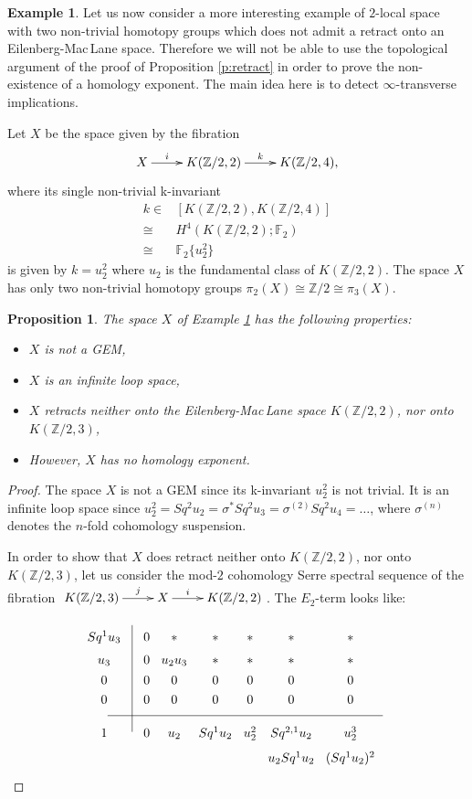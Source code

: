\documentclass{amsart}
\newtheorem{prop}[thm]{Proposition}
\theoremstyle{definition}
\newtheorem{exmp}[thm]{Example}
\theoremstyle{remark}
\newcommand{\Z}{\mathbb{Z}}
\newcommand{\F}{\mathbb{F}}
\begin{document}
\begin{exmp}\label{e:no_retract}
Let us now consider a more interesting example of $2$-local space with two non-trivial homotopy groups which does not admit a retract onto an Eilenberg-Mac\,Lane space. Therefore we will not be able to use the topological argument of the proof of Proposition \ref{p:retract} in order to prove the non-existence of a homology exponent. The main idea here is to detect $\infty$-transverse implications.

Let $X$ be the space given by the fibration
$$\xymatrix{
X\ar[r]^-i &K(\Z/2,2)\ar[r]^-k &K(\Z/2,4),
}$$
where its single non-trivial k-invariant
\begin{align*}
k \in& [K(\Z/2,2),K(\Z/2,4)]\\
\cong &H^4(K(\Z/2,2);\F_2)\\
\cong &\F_2\{u_2^2\}
\end{align*}
is given by $k=u_2^2$ where $u_2$ is the fundamental class of $K(\Z/2,2)$. The space $X$ has only two non-trivial homotopy groups $\pi_2(X)\cong\Z/2\cong\pi_3(X)$.

\begin{prop}\label{p:no_retract}
The space $X$ of Example \ref{e:no_retract} has the following properties:
\begin{itemize}
\item[1.]{$X$ is not a GEM,}
\item[2.]{$X$ is an infinite loop space,}
\item[3.]{$X$ retracts neither onto the Eilenberg-Mac\,Lane space $K(\Z/2,2)$, nor onto $K(\Z/2,3)$,}
\item[4.]{However, $X$ has no homology exponent.}
\end{itemize}
\end{prop}

\begin{proof}
The space $X$ is not a GEM since its k-invariant $u_2^2$ is not trivial. It is an infinite loop space since $u_2^2=Sq^2u_2=\sigma^*Sq^2u_3=\sigma^{(2)}Sq^2u_4=\dots$, where $\sigma^{(n)}$ denotes the $n$-fold cohomology suspension. 

In order to show that $X$ does retract neither onto $K(\Z/2,2)$, nor onto $K(\Z/2,3)$, let us consider the mod-$2$ cohomology Serre spectral sequence of the fibration $\xymatrix{K(\Z/2,3)\ar[r]^-j &X\ar[r]^-i &K(\Z/2,2)}$. 
The $E_2$-term looks like:
$$\xymatrix@R=0.1cm@C=0.1cm{
&&\\
{Sq^1u_3}  &&0 &{*} &{*} &{*} &{*} &{*}\\
{u_3}  &&0 &u_2u_3&{*} &{*} &{*} &{*}\\
{0} &&0 &0 &0 &0 &0 &0\\
{0} &&0 &0 &0 &0 &0 &0\\ \ar@{-}[rrrrrrrr] &&&&&&&&\\
{1} &\ar@{-}[uuuuuu] &{0} &{u_2} &{Sq^1u_2} &{u_2^2} &{Sq^{2,1}u_2} &{u_2^3}\\
&&&&&&{u_2Sq^1u_2} &{(Sq^1 u_2)^2}
}$$


\end{proof}
\end{exmp}
\end{document}
